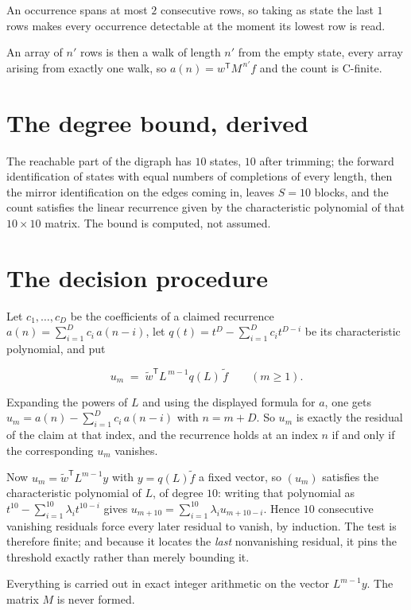 \documentclass[11pt]{article}
\theoremstyle{definition}
\begin{document}
An occurrence spans at most $2$ consecutive rows, so taking as state the last $1$ rows makes every occurrence detectable at the moment its lowest row is read.

An array of $n'$ rows is then a walk of length $n'$ from the empty state, every array arising from exactly one walk, so $a(n) = w^{\mathsf T}M^{\,n'}f$ and the count is C-finite.

\section{The degree bound, derived}

The reachable part of the digraph has $10$ states, $10$ after trimming; the forward identification of states with equal numbers of completions of every length, then the mirror identification on the edges coming in, leaves $S = 10$ blocks, and the count satisfies the linear recurrence given by the characteristic polynomial of that $10\times10$ matrix. The bound is computed, not assumed.

\section{The decision procedure}

Let $c_1,\dots,c_D$ be the coefficients of a claimed recurrence $a(n) = \sum_{i=1}^{D} c_i\,a(n-i)$, let $q(t) = t^{D} - \sum_{i=1}^{D} c_i t^{D-i}$ be its characteristic polynomial, and put

\[u_m \;=\; \tilde w^{\mathsf T} L^{\,m-1} q(L)\,\tilde f \qquad (m \ge 1).\]

Expanding the powers of $L$ and using the displayed formula for $a$, one gets $u_m = a(n) - \sum_{i=1}^{D} c_i\,a(n-i)$ with $n = m + D$. So $u_m$ is exactly the residual of the claim at that index, and the recurrence holds at an index $n$ if and only if the corresponding $u_m$ vanishes.

Now $u_m = \tilde w^{\mathsf T} L^{m-1} y$ with $y = q(L)\tilde f$ a fixed vector, so $(u_m)$ satisfies the characteristic polynomial of $L$, of degree $10$: writing that polynomial as $t^{10} - \sum_{i=1}^{10} \lambda_i t^{10-i}$ gives $u_{m+10} = \sum_{i=1}^{10} \lambda_i u_{m+10-i}$. Hence $10$ consecutive vanishing residuals force every later residual to vanish, by induction. The test is therefore finite; and because it locates the {\itshape last} nonvanishing residual, it pins the threshold exactly rather than merely bounding it.

Everything is carried out in exact integer arithmetic on the vector $L^{m-1}y$. The matrix $M$ is never formed.
\end{document}
